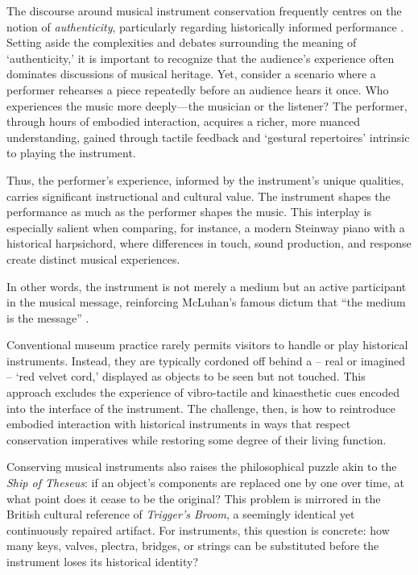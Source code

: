 The discourse around musical instrument conservation frequently centres on the notion of \emph{authenticity}, particularly regarding historically informed performance \cite{laurenson_authenticity_2006,davies_authenticity_2001}. Setting aside the complexities and debates surrounding the meaning of `authenticity,' it is important to recognize that the audience's experience often dominates discussions of musical heritage. Yet, consider a scenario where a performer rehearses a piece repeatedly before an audience hears it once. Who experiences the music more deeply—the musician or the listener? The performer, through hours of embodied interaction, acquires a richer, more nuanced understanding, gained through tactile feedback and `gestural repertoires' \cite[][]{levinson_music_1990} intrinsic to playing the instrument.

Thus, the performer’s experience, informed by the instrument’s unique qualities, carries significant instructional and cultural value. The instrument shapes the performance as much as the performer shapes the music. This interplay is especially salient when comparing, for instance, a modern Steinway piano with a historical harpsichord, where differences in touch, sound production, and response create distinct musical experiences.

In other words, the instrument is not merely a medium but an active participant in the musical message, reinforcing McLuhan’s famous dictum that ``the medium is the message'' \cite[][]{mcluhan_understanding_1964}.

Conventional museum practice rarely permits visitors to handle or play historical instruments. Instead, they are typically cordoned off behind a -- real or imagined -- `red velvet cord,' displayed as objects to be seen but not touched. This approach excludes the experience of vibro-tactile and kinaesthetic cues encoded into the interface of the instrument. The challenge, then, is how to reintroduce embodied interaction with historical instruments in ways that respect conservation imperatives while restoring some degree of their living function.


Conserving musical instruments also raises the philosophical puzzle akin to the \emph{Ship of Theseus}: if an object’s components are replaced one by one over time, at what point does it cease to be the original? This problem is mirrored in the British cultural reference of \emph{Trigger's Broom}, a seemingly identical yet continuously repaired artifact. For instruments, this question is concrete: how many keys, valves, plectra, bridges, or strings can be substituted before the instrument loses its historical identity?

